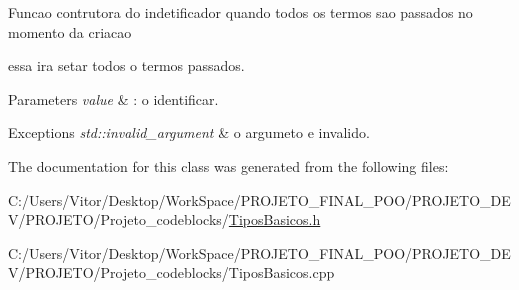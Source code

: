Funcao contrutora do indetificador quando todos os termos sao passados no momento da criacao \par
 essa ira setar todos o termos passados. 


\begin{DoxyParams}{Parameters}
{\em value} & \-: o identificar. \\
\hline
\end{DoxyParams}

\begin{DoxyExceptions}{Exceptions}
{\em std\-::invalid\-\_\-argument} & o argumeto e invalido. \\
\hline
\end{DoxyExceptions}


The documentation for this class was generated from the following files\-:\begin{DoxyCompactItemize}
\item 
C\-:/\-Users/\-Vitor/\-Desktop/\-Work\-Space/\-P\-R\-O\-J\-E\-T\-O\-\_\-\-F\-I\-N\-A\-L\-\_\-\-P\-O\-O/\-P\-R\-O\-J\-E\-T\-O\-\_\-\-D\-E\-V/\-P\-R\-O\-J\-E\-T\-O/\-Projeto\-\_\-codeblocks/\hyperlink{_tipos_basicos_8h}{Tipos\-Basicos.\-h}\item 
C\-:/\-Users/\-Vitor/\-Desktop/\-Work\-Space/\-P\-R\-O\-J\-E\-T\-O\-\_\-\-F\-I\-N\-A\-L\-\_\-\-P\-O\-O/\-P\-R\-O\-J\-E\-T\-O\-\_\-\-D\-E\-V/\-P\-R\-O\-J\-E\-T\-O/\-Projeto\-\_\-codeblocks/Tipos\-Basicos.\-cpp\end{DoxyCompactItemize}
